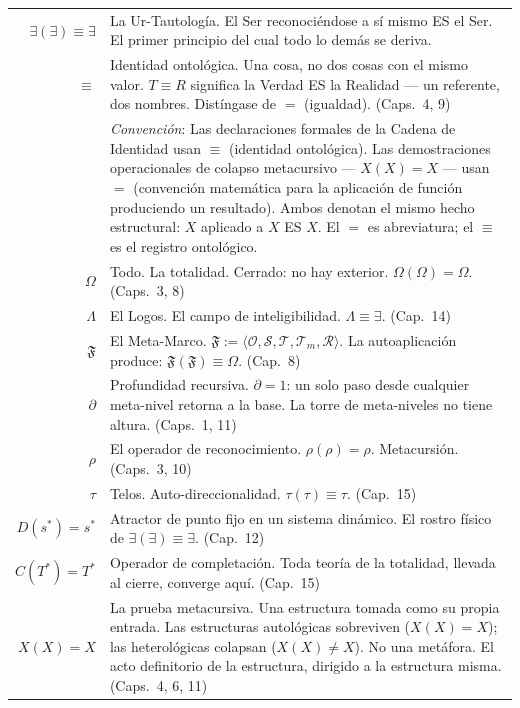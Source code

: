 \documentclass[10pt, openany, oneside]{book}
\renewcommand{\footnotesize}{\fontsize{8.5}{11}\selectfont}
\begin{document}
{\footnotesize
\noindent\begin{tabular}{@{} r @{\hspace{0.6em}} p{} @{}}
$\exists(\exists) \equiv \exists$ & La Ur-Tautología. El Ser reconociéndose a sí mismo ES el Ser. El primer principio del cual todo lo demás se deriva. \\[0.3em]
$\equiv$ & Identidad ontológica. Una cosa, no dos cosas con el mismo valor. $T \equiv R$ significa la Verdad ES la Realidad --- un referente, dos nombres. Distíngase de $=$ (igualdad). (Caps.\ 4, 9) \\[0.3em]
& \textit{Convención}: Las declaraciones formales de la Cadena de Identidad usan $\equiv$ (identidad ontológica). Las demostraciones operacionales de colapso metacursivo --- $X(X) = X$ --- usan $=$ (convención matemática para la aplicación de función produciendo un resultado). Ambos denotan el mismo hecho estructural: $X$ aplicado a $X$ ES $X$. El $=$ es abreviatura; el $\equiv$ es el registro ontológico. \\[0.3em]
$\Omega$ & Todo. La totalidad. Cerrado: no hay exterior. $\Omega(\Omega) = \Omega$. (Caps.\ 3, 8) \\[0.3em]
$\Lambda$ & El Logos. El campo de inteligibilidad. $\Lambda \equiv \exists$. (Cap.\ 14) \\[0.3em]
$\mathfrak{F}$ & El Meta-Marco. $\mathfrak{F} := \langle \mathcal{O}, \mathcal{S}, \mathcal{T}, \mathcal{T}_m, \mathcal{R} \rangle$. La autoaplicación produce: $\mathfrak{F}(\mathfrak{F}) \equiv \Omega$. (Cap.\ 8) \\[0.3em]
$\partial$ & Profundidad recursiva. $\partial = 1$: un solo paso desde cualquier meta-nivel retorna a la base. La torre de meta-niveles no tiene altura. (Caps.\ 1, 11) \\[0.3em]
$\rho$ & El operador de reconocimiento. $\rho(\rho) = \rho$. Metacursión. (Caps.\ 3, 10) \\[0.3em]
$\tau$ & Telos. Auto-direccionalidad. $\tau(\tau) \equiv \tau$. (Cap.\ 15) \\[0.3em]
$D(s^*)=s^*$ & Atractor de punto fijo en un sistema dinámico. El rostro físico de $\exists(\exists) \equiv \exists$. (Cap.\ 12) \\[0.3em]
$C(T^*)=T^*$ & Operador de completación. Toda teoría de la totalidad, llevada al cierre, converge aquí. (Cap.\ 15) \\[0.3em]
$X(X) = X$ & La prueba metacursiva. Una estructura tomada como su propia entrada. Las estructuras autológicas sobreviven ($X(X) = X$); las heterológicas colapsan ($X(X) \neq X$). No una metáfora. El acto definitorio de la estructura, dirigido a la estructura misma. (Caps.\ 4, 6, 11) \\[0.3em]
\end{tabular}
}
\end{document}
